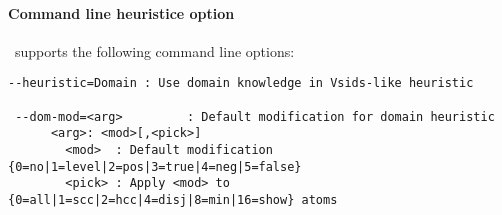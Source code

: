  \paragraph{Command line heuristice option}
 \clasp\ supports the following command line options:
{
\scriptsize\begin{lstlisting}[numbers=none]
 --heuristic=Domain : Use domain knowledge in Vsids-like heuristic

 --dom-mod=<arg>         : Default modification for domain heuristic
      <arg>: <mod>[,<pick>]
        <mod>  : Default modification {0=no|1=level|2=pos|3=true|4=neg|5=false}
        <pick> : Apply <mod> to {0=all|1=scc|2=hcc|4=disj|8=min|16=show} atoms
\end{lstlisting}
}

\iffalse

\fi
